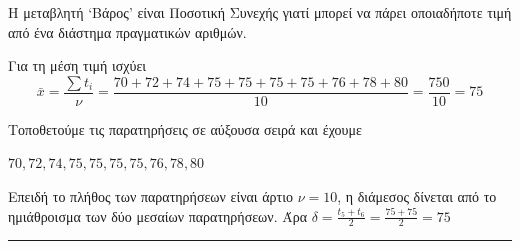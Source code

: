 \begin{alist}
\item Η μεταβλητή ‘Βάρος’ είναι Ποσοτική Συνεχής γιατί μπορεί να πάρει οποιαδήποτε τιμή από ένα διάστημα πραγματικών αριθμών.
\item 
\begin{rlist}
\item Για τη μέση τιμή ισχύει
\[ \bar{x} = \frac{\sum t_i}{\nu} = \frac{70+72+74+75+75+75+75+76+78+80}{10} = \frac{750}{10} = 75 \]
\item Τοποθετούμε τις παρατηρήσεις σε αύξουσα σειρά και έχουμε
        
$70, 72, 74, 75, 75, 75, 75, 76, 78, 80$
        
Επειδή το πλήθος των παρατηρήσεων είναι άρτιο $\nu=10$, η διάμεσος δίνεται από το ημιάθροισμα των δύο μεσαίων παρατηρήσεων. Άρα $\delta = \frac{t_5 + t_6}{2} = \frac{75+75}{2} = 75$
\end{rlist}
\end{alist}
\vspace{6mm}
\noindent\rule{\textwidth}{0.4pt}
\vspace{6mm}

